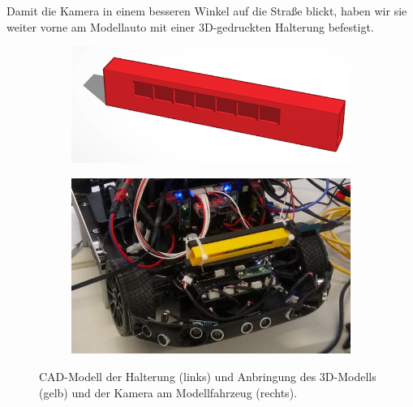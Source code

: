 \documentclass[a4paper,12pt]{report}
\begin{document}
Damit die Kamera in einem besseren Winkel auf die Straße blickt, haben wir sie weiter vorne am Modellauto mit einer 3D-gedruckten Halterung befestigt. 
\begin{figure}[ht]
	\centering
	\begin{subfigure}[c]{.45\textwidth}
		\includegraphics[width=\textwidth]{assets/Kamerahalterung.PNG}
	\end{subfigure}
	\begin{subfigure}[c]{.45\textwidth}
		\includegraphics[width=\textwidth]{assets/Kamera-Anbringung.jpg}
	\end{subfigure}
	\caption{CAD-Modell der Halterung (links) und Anbringung des 3D-Modells (gelb) und der Kamera am Modellfahrzeug (rechts).}
	\label{img-camera}
\end{figure}
\end{document}
